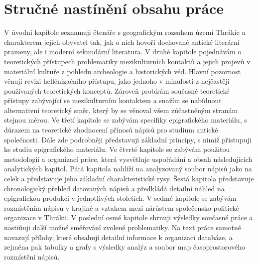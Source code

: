 
\section[stručné-nastínění-obsahu-práce]{Stručné nastínění obsahu práce}

V úvodní kapitole seznamuji čtenáře s geografickým rozsahem území Thrákie a charakterem jejich obyvatel tak, jak o nich hovoří dochované antické literární prameny, ale i moderní sekundární literatura. V druhé kapitole pojednávám o teoretických přístupech problematiky mezikulturních kontaktů a jejich projevů v materiální kultuře z pohledu archeologie a historických věd. Hlavní pozornost věnuji revizi hellénizačního přístupu, jako jednoho v minulosti z nejčastěji používaných teoretických konceptů. Zároveň probírám současné teoretické přístupy zabývající se mezikulturním kontaktem a snažím se nabídnout alternativní teoretický směr, který by se věnoval všem zúčastněným stranám stejnou měrou. Ve třetí kapitole se zabývám specifiky epigrafického materiálu, s důrazem na teoretické zhodnocení přínosů nápisů pro studium antické společnosti. Dále zde podrobněji představuji základní principy, s nimiž přistupuji ke studiu epigrafického materiálu. Ve čtvrté kapitole se zabývám použitou metodologií a organizací práce, která vysvětluje uspořádání a obsah následujících analytických kapitol. Pátá kapitola nahlíží na analyzovaný soubor nápisů jako na celek a představuje jeho základní charakteristické rysy. Šestá kapitola představuje chronologický přehled datovaných nápisů a předkládá detailní náhled na epigrafickou produkci v jednotlivých stoletích. V sedmé kapitole se zabývám rozmístěním nápisů v krajině a vztahem mezi nárůstem společensko-politické organizace v Thrákii. V poslední osmé kapitole shrnuji výsledky současné práce a nastiňuji další možné směřování zvolené problematiky. Na text práce samotné navazují přílohy, které obsahují detailní informace k organizaci databáze, a zejména pak tabulky a grafy s výsledky analýz a soubor map časoprostorového rozmístění nápisů.

